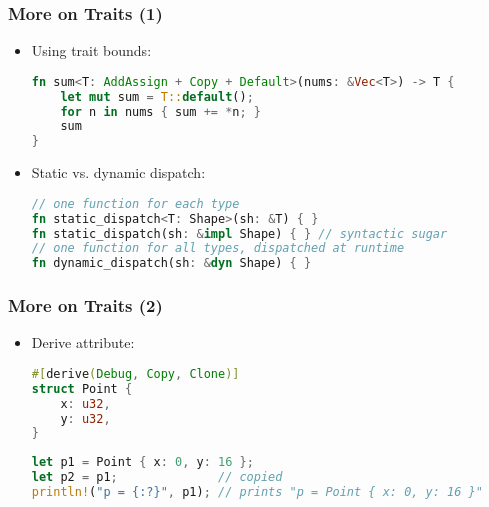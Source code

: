 \begin{frame}[fragile]
    \frametitle{More on Traits (1)}

    \begin{itemize}
        \item Using trait bounds:
        \begin{lstlisting}[language=rust]
fn sum<T: AddAssign + Copy + Default>(nums: &Vec<T>) -> T {
    let mut sum = T::default();
    for n in nums { sum += *n; }
    sum
}
        \end{lstlisting}

        \pause

        \item Static vs. dynamic dispatch:
        \begin{lstlisting}[language=rust]
// one function for each type
fn static_dispatch<T: Shape>(sh: &T) { }
fn static_dispatch(sh: &impl Shape) { } // syntactic sugar
// one function for all types, dispatched at runtime
fn dynamic_dispatch(sh: &dyn Shape) { }
        \end{lstlisting}
    \end{itemize}
\end{frame}

\begin{frame}[fragile]
    \frametitle{More on Traits (2)}

    \begin{itemize}
        \item Derive attribute:
        \begin{lstlisting}[language=rust]
#[derive(Debug, Copy, Clone)]
struct Point {
    x: u32,
    y: u32,
}
        \end{lstlisting}

        \pause

        \begin{lstlisting}[language=rust]
let p1 = Point { x: 0, y: 16 };
let p2 = p1;              // copied
println!("p = {:?}", p1); // prints "p = Point { x: 0, y: 16 }"
        \end{lstlisting}
    \end{itemize}
\end{frame}

